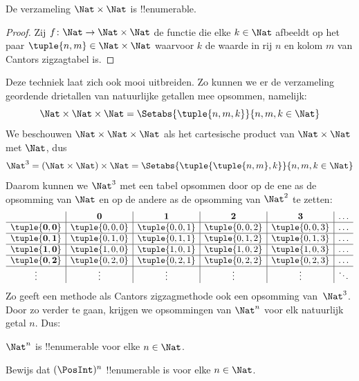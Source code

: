 \documentclass[openany]{memoir}
\begin{document}
\begin{prop}
De verzameling $\Nat \times \Nat$ is !!{enumerable}.
\end{prop}

\begin{proof}
Zij $f \colon \Nat \to \Nat\times\Nat$ de functie die elke $k \in \Nat$
afbeeldt op het paar $\tuple{n,m} \in \Nat \times \Nat$ waarvoor $k$ de
waarde in rij $n$ en kolom $m$ van Cantors zigzagtabel is. 
\end{proof}

\begin{explain}
Deze techniek laat zich ook mooi uitbreiden. Zo kunnen we er de verzameling
geordende drietallen van natuurlijke getallen mee opsommen, namelijk:
\[
\Nat \times \Nat \times \Nat = \Setabs{\tuple{n,m,k}}{n,m,k \in \Nat}
\]
We beschouwen $\Nat \times \Nat \times \Nat$ als het cartesische product van
$\Nat \times \Nat$ met $\Nat$, dus
\[
\Nat^3 = (\Nat \times \Nat) \times \Nat =
\Setabs{\tuple{\tuple{n,m},k}}{n, m, k
  \in \Nat }
\]
Daarom kunnen we $\Nat^3$ met een tabel opsommen door op de ene as de
opsomming van $\Nat$ en op de andere as de opsomming van $\Nat^2$ te zetten:
\[
\begin{array}{ c | c | c | c | c | c}
& \mathbf 0 & \mathbf 1 & \mathbf 2 & \mathbf 3 & \dots \\
\hline
\mathbf{\tuple{0,0}} & \tuple{0,0,0} & \tuple{0,0,1} & \tuple{0,0,2} & \tuple{0,0,3} & \dots \\
\hline
\mathbf{\tuple{0,1}} & \tuple{0,1,0} & \tuple{0,1,1} & \tuple{0,1,2} & \tuple{0,1,3} & \dots \\
\hline
\mathbf{\tuple{1,0}} & \tuple{1,0,0} & \tuple{1,0,1} & \tuple{1,0,2} & \tuple{1,0,3} & \dots \\
\hline
\mathbf{\tuple{0,2}} & \tuple{0,2,0} & \tuple{0,2,1} & \tuple{0,2,2} & \tuple{0,2,3} & \dots\\
\hline
\vdots & \vdots & \vdots & \vdots & \vdots & \ddots \\
\end{array}
\]
Zo geeft een methode als Cantors zigzagmethode ook een opsomming van~$\Nat^3$.
Door zo verder te gaan, krijgen we opsommingen van $\Nat^n$ voor elk natuurlijk
getal $n$. Dus:
\end{explain}

\begin{prop}
$\Nat^n$ is !!{enumerable} voor elke $n \in \Nat$.
\end{prop}

\begin{prob}\label{sfr:siz:zigzag:prob:posint-n}
Bewijs dat $(\PosInt)^n$ !!{enumerable} is voor elke $n \in \Nat$.
\end{prob}
\end{document}
